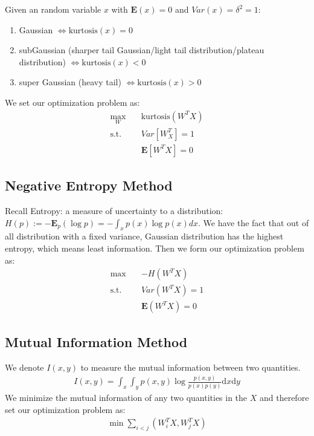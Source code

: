  Given an random variable $x$ with $\textbf{E}(x)=0$ and $Var(x)=\delta^2=1$:
 \begin{enumerate}
     \item  Gaussian $\iff \text{kurtosis}(x)=0$
     \item  subGaussian (sharper tail Gaussian/light tail distribution/plateau distribution) $\iff \text{kurtosis}(x)<0$
     \item  super Gaussian (heavy tail) $\iff \text{kurtosis}(x)>0$
 \end{enumerate}

We set our optimization problem as:
\begin{align*}
    \max _W \quad & \text{kurtosis}(W^TX) \\
    \text{s.t.} \quad & Var[W^T_X] = 1 \\
            \quad & \textbf{E}[W^TX] = 0
\end{align*}

\subsection{Negative Entropy Method}
Recall Entropy: a measure of uncertainty to a distribution: $H(p):=-\textbf{E}_p(\log p)=-\int_x p(x)\log p(x)dx$. We have the fact that out of all distribution with a fixed variance, Gaussian distribution has the highest entropy, which means least information. Then we form our optimization problem as:
\begin{align*}
    \max \quad & -H(W^TX) \\
    \text{s.t.} \quad & Var(W^TX)=1 \\
                \quad & \textbf{E}(W^TX) = 0
\end{align*}

\subsection{Mutual Information Method}
We denote $I(x,y)$ to measure the mutual information between two quantities. 
\begin{align*}
    I(x,y) = \int _x \int _y p(x,y) \log \frac{p(x,y)}{p(x)p(y)} \text{d}x \text{d}y
\end{align*}
We minimize the mutual information of any two quantities in the $X$ and therefore set our optimization problem as: 
\begin{align*}
    \min \sum _{i<j} (W_i^TX,W^T_jX)
\end{align*}